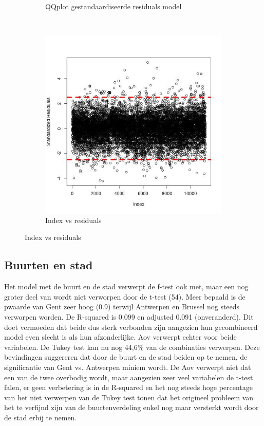 \documentclass[a4paper,kulak]{kulakarticle} %
\begin{document}
\begin{figure}[H]
\begin{subfigure}[b]{0.3\textwidth}
		\caption{QQplot gestandaardiseerde residuals model}
		\label{fig:qqne}
	\end{subfigure}
	~
	\begin{subfigure}[b]{0.3\textwidth}
		\includegraphics[width=\textwidth]{stdne.jpg}
		\caption{Index vs residuals}
		\label{fig:stdne}
	\end{subfigure}
\end{figure}

\subsection{Buurten en stad}
Het model met de buurt en de stad verwerpt de f-test ook met, maar een nog groter deel van  wordt niet verworpen door de t-test (54). Meer bepaald is de pwaarde van Gent zeer hoog (0.9) terwijl Antwerpen en Brussel nog steeds verworpen worden. 
De R-squared is 0.099 en adjusted 0.091 (onveranderd). Dit doet vermoeden dat beide dus sterk verbonden zijn aangezien hun gecombineerd model even slecht is als hun afzonderlijke.
Aov verwerpt echter voor beide variabelen.
De Tukey test kan nu nog 44,6\% van de combinaties verwerpen.
Deze bevindingen suggereren dat door de buurt en de stad beiden op te nemen, de significantie van Gent vs. Antwerpen miniem wordt. De Aov verwerpt niet dat een van de twee overbodig wordt, maar aangezien zeer veel variabelen de t-test falen, er geen verbetering is in de R-squared en het nog steeds hoge percentage van het niet verwerpen van de Tukey test tonen dat het origineel probleem van het te verfijnd zijn van de buurtenverdeling enkel nog maar versterkt wordt door de stad erbij te nemen.
\end{document}
